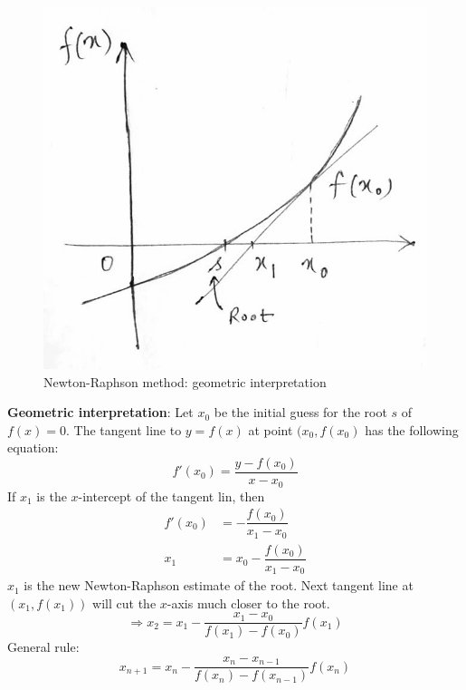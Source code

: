 \documentclass[a4paper,11pt]{book}
\begin{document}
\begin{figure}[ht]
	\centering
	\includegraphics[scale=0.3]{code/sort/pic/newtonraphson.jpeg}
	\caption{Newton-Raphson method: geometric interpretation}
\end{figure}

\noindent \textbf{Geometric interpretation}: Let $x_0$ be the initial guess for the root $s$ of $f(x)=0$. The tangent line to $y=f(x)$ at point $(x_0, f(x_0)$ has the following equation:
$$f'(x_0) = \dfrac{y-f(x_0)}{x-x_0}$$
\noindent If $x_1$ is the $x$-intercept of the tangent lin, then
\begin{align*}
    f'(x_0) &= -\dfrac{f(x_0)}{x_1-x_0}\\
    x_1 &= x_0 - \dfrac{f(x_0)}{x_1-x_0}
\end{align*}
\noindent $x_1$ is the new Newton-Raphson estimate of the root. Next tangent line at $\left(x_1, f(x_1)\right)$ will cut the $x$-axis much closer to the root.
$$\Rightarrow x_2 = x_1 - \dfrac{x_1-x_0}{f(x_1)-f(x_0)}f(x_1)$$
\noindent General rule:
$$x_{n+1} = x_n - \dfrac{x_n-x_{n-1}}{f(x_n)-f(x_{n-1})}f(x_n)$$
\end{document}
